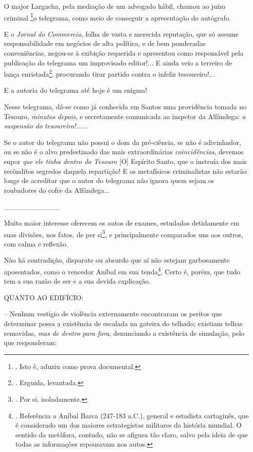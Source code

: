 O major Largacha, pela mediação de um advogado hábil, chamou ao juízo
criminal \footnote{. Isto é, aduziu como prova documental.}o telegrama,
como meio de conseguir a apresentação do autógrafo.

E o \emph{Jornal do Commercio}, folha de vasta e merecida reputação, que
só assume responsabilidade em negócios de alta política, e de bem
ponderadas conveniências, negou-se à exibição requerida e apresentou
como responsável pela publicação do telegrama um improvisado editor!...
E ainda veio a terreiro de lança enristada\footnote{. Erguida,
  levantada.}, procurando tirar partido contra o infeliz tesoureiro!...

E a autoria do telegrama até hoje é um enigma!

Nesse telegrama, dá-se como já conhecida em Santos uma providência
tomada no Tesouro, \emph{minutos depois}, e secretamente comunicada ao
inspetor da Alfândega: \emph{a suspensão do tesoureiro!......}

Se o autor do telegrama não possui o dom da pré-ciência, se não é
adivinhador, ou se não é o alvo predestinado das mais extraordinárias
\emph{coincidências}, devemos supor \emph{que ele tinha dentro do
Tesouro} {[}O{]} Espírito Santo, que o instruía dos mais recônditos
segredos daquela repartição! E os metafísicos criminalistas não estarão
longe de acreditar que o autor do telegrama não ignora quem sejam os
roubadores do cofre da Alfândega...

\_\_\_\_\_\_\_\_\_\_\_

Muito maior interesse oferecem os autos de exames, estudados detidamente
em suas divisões, nos fatos, de per si\footnote{. Por si, isoladamente.},
e principalmente comparados uns aos outros, com calma e reflexão.

Não há contradição, disparate ou absurdo que aí não estejam garbosamente
aposentados, como o vencedor Aníbal em sua tenda\footnote{. Referência a
  Aníbal Barca (247-183 a.C.), general e estadista cartaginês, que é
  considerado um dos maiores estrategistas militares da história
  mundial. O sentido da metáfora, contudo, não se afigura tão claro,
  salvo pela ideia de que todas as informações repousavam nos autos.}.
Certo é, porém, que tudo tem a sua razão de ser e a sua devida
explicação.

QUANTO AO EDIFÍCIO:

-- Nenhum vestígio de violência externamente encontraram os peritos que
determinar possa a existência de escalada na gateira do telhado;
existiam telhas removidas, \emph{mas de dentro para fora}, denunciando a
existência de simulação, pelo que responderam:

